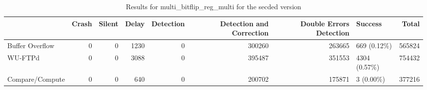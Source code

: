\begin{table}[t]
	\centering
	\caption{Results for multi_bitflip_reg_multi for the secded version}
	\label{table:end_sim_by_status_secded_3_multi_bitflip_reg_multi}
	\begin{tabular}{lrrrrrrlr}
		\toprule
		                & Crash & Silent & Delay & Detection & Detection and Correction & Double Errors Detection & Success       & Total  \\
		\midrule
		Buffer Overflow & 0     & 0      & 1230  & 0         & 300260                   & 263665                  & 669 (0.12\%)  & 565824 \\
		WU-FTPd         & 0     & 0      & 3088  & 0         & 395487                   & 351553                  & 4304 (0.57\%) & 754432 \\
		Compare/Compute & 0     & 0      & 640   & 0         & 200702                   & 175871                  & 3 (0.00\%)    & 377216 \\
		\bottomrule
	\end{tabular}
\end{table}
